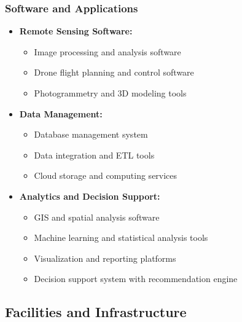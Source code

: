 \subsubsection{Software and Applications}
\begin{itemize}
    \item \textbf{Remote Sensing Software:}
    \begin{itemize}
        \item Image processing and analysis software
        \item Drone flight planning and control software
        \item Photogrammetry and 3D modeling tools
    \end{itemize}
    
    \item \textbf{Data Management:}
    \begin{itemize}
        \item Database management system
        \item Data integration and ETL tools
        \item Cloud storage and computing services
    \end{itemize}
    
    \item \textbf{Analytics and Decision Support:}
    \begin{itemize}
        \item GIS and spatial analysis software
        \item Machine learning and statistical analysis tools
        \item Visualization and reporting platforms
        \item Decision support system with recommendation engine
    \end{itemize}
\end{itemize}

\subsection{Facilities and Infrastructure}

